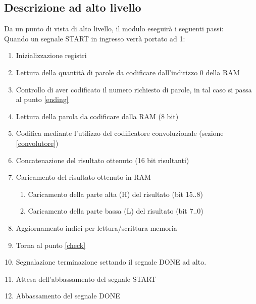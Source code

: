 \documentclass{article}
\begin{document}
\subsection{Descrizione ad alto livello}
\label{altolivello}
Da un punto di vista di alto livello, il modulo eseguirà i seguenti passi:
\\
Quando un segnale START in ingresso verrà portato ad 1:
\begin{enumerate}
    \item Inizializzazione registri
    \item Lettura della quantità di parole da codificare dall'indirizzo 0 della RAM
    \item Controllo di aver codificato il numero richiesto di parole, in tal caso si passa al punto \ref{ending}
    \label{check}
    \item Lettura della parola da codificare dalla RAM (8 bit)
    \item Codifica mediante l'utilizzo del codificatore convoluzionale (sezione \ref{convolutore})
    \item Concatenazione del risultato ottenuto (16 bit risultanti)
    \item Caricamento del risultato ottenuto in RAM
    \begin{enumerate}
        \item Caricamento della parte alta (H) del risultato (bit 15..8)
        \item Caricamento della parte bassa (L) del risultato (bit 7..0)
    \end{enumerate}
    \item Aggiornamento indici per lettura/scrittura memoria
    \item Torna al punto \ref{check}
    \item Segnalazione terminazione settando il segnale DONE ad alto.
    \label{ending}
    \item Attesa dell'abbassamento del segnale START
    \item Abbassamento del segnale DONE
\end{enumerate}
\end{document}
